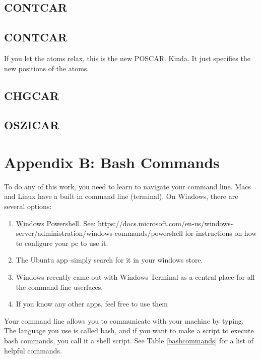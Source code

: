 \documentclass{article}
\begin{document}
\subsection*{CONTCAR}

\subsection*{CONTCAR}
If you let the atoms relax, this is the new POSCAR. Kinda. It just
specifies the new positions of the atoms. 

\subsection*{CHGCAR}

\subsection*{OSZICAR}


\section*{Appendix B: Bash Commands} \label{sec:bash}

To do any of this work, you need to learn to navigate your command
line. Macs and Linux have a built in command line (terminal). On
Windows, there are several options:
\begin{enumerate}
  \item{Windows Powershell. See:
      https://docs.microsoft.com/en-us/windows-
      server/administration/windows-commands/powershell
      for instructions on how to configure your pc to use it.}
  \item{The Ubuntu app--simply search for it in your windows store.}
  \item{Windows recently came out with Windows Terminal as a 
      central place for all the command line userfaces.}
  \item{If you know any other apps, feel free to use them}
\end{enumerate}
Your command line allows you to communicate with your machine by
typing. The language you use is called bash, and if you want to make a
script to execute bash commands, you call it a shell script. See Table
\ref{bashcommands} for a list of helpful commands.  
\end{document}
